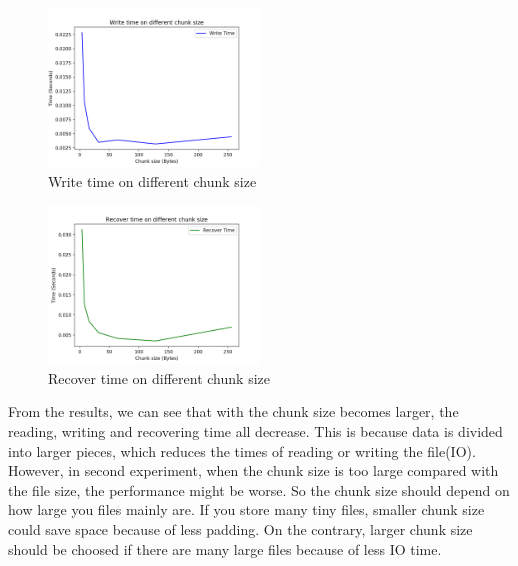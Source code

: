 \documentclass[journal]{IEEEtran}
\begin{document}
\begin{figure}[htbp]

	\centering

	\captionsetup{justification=centering}

	\includegraphics[width=0.5\textwidth]{fig/result_write_small.png}

	\caption{Write time on different chunk size}

\end{figure}


\begin{figure}[htbp]

	\centering

	\captionsetup{justification=centering}

	\includegraphics[width=0.5\textwidth]{fig/result_recover_small.png}

	\caption{Recover time on different chunk size}

\end{figure}


From the results, we can see that with the chunk size becomes larger, the reading, writing and recovering time all decrease. This is because data is divided into larger pieces, which reduces the times of reading or writing the file(IO). However, in second experiment, when the chunk size is too large compared with the file size, the performance might be worse. So the chunk size should depend on how large you files mainly are. If you store many tiny files, smaller chunk size could save space because of less padding. On the contrary, larger chunk size should be choosed if there are many large files because of less IO time.
\end{document}
